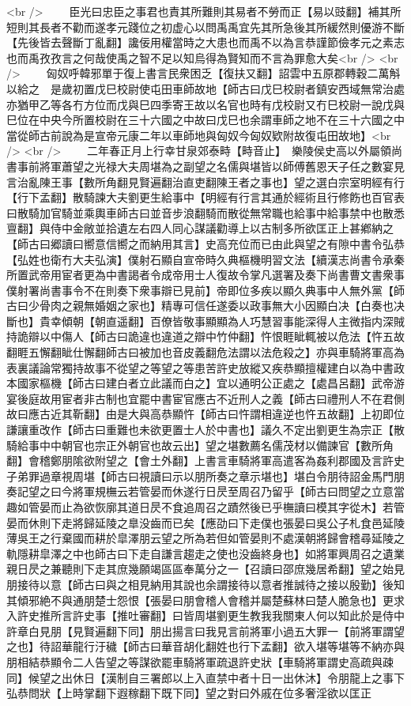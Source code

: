 <br />
　　臣光曰忠臣之事君也責其所難則其易者不勞而正【易以豉翻】補其所短則其長者不勸而遂孝元踐位之初虚心以問禹禹宜先其所急後其所緩然則優游不斷【先後皆去聲斷丁亂翻】讒佞用權當時之大患也而禹不以為言恭謹節儉孝元之素志也而禹孜孜言之何哉使禹之智不足以知烏得為賢知而不言為罪愈大矣<br />
<br />
　　匈奴呼韓邪單于復上書言民衆困乏【復扶又翻】詔雲中五原郡轉穀二萬斛以給之　是歲初置戊巳校尉使屯田車師故地【師古曰戊巳校尉者鎮安西域無常治處亦猶甲乙等各冇方位而戊與巳四季寄王故以名官也時有戊校尉又冇巳校尉一說戊與巳位在中央今所置校尉在三十六國之中故曰戊巳也余謂車師之地不在三十六國之中當從師古前說為是宣帝元康二年以車師地與匈奴今匈奴欵附故復屯田故地】<br />
<br />
　　二年春正月上行幸甘泉郊泰畤【畤音止】　樂陵侯史高以外屬領尚書事前將軍蕭望之光禄大夫周堪為之副望之名儒與堪皆以師傅舊恩天子任之數宴見言治亂陳王事【數所角翻見賢遍翻治直吏翻陳王者之事也】望之選白宗室明經有行【行下孟翻】散騎諫大夫劉更生給事中【明經有行言其通於經術且行修飭也百官表曰散騎加官騎並乘輿車師古曰並音步浪翻騎而散從無常職也給事中給事禁中也散悉亶翻】與侍中金敞並拾遺左右四人同心謀議勸導上以古制多所欲匡正上甚鄕納之【師古曰郷讀曰嚮意信嚮之而納用其言】史高充位而已由此與望之有隙中書令弘恭【弘姓也衛冇大夫弘演】僕射石顯自宣帝時久典樞機明習文法【續漢志尚書令承秦所置武帝用宦者更為中書謁者令成帝用士人復故令掌凡選署及奏下尚書曹文書衆事僕射署尚書事令不在則奏下衆事辯已見前】帝即位多疾以顯久典事中人無外黨【師古曰少骨肉之親無婚姻之家也】精專可信任遂委以政事無大小因顯白决【白奏也决斷也】貴幸傾朝【朝直遥翻】百僚皆敬事顯顯為人巧慧習事能深得人主微指内深賊持詭辯以中傷人【師古曰詭違也違道之辯中竹仲翻】忤恨睚眦輒被以危法【忤五故翻睚五懈翻眦仕懈翻師古曰被加也音皮義翻危法謂以法危殺之】亦與車騎將軍高為表裏議論常獨持故事不從望之等望之等患苦許史放縱又疾恭顯擅權建白以為中書政本國家樞機【師古曰建白者立此議而白之】宜以通明公正處之【處昌呂翻】武帝游宴後庭故用宦者非古制也宜罷中書宦官應古不近刑人之義【師古曰禮刑人不在君側故曰應古近其靳翻】由是大與高恭顯忤【師古曰忤謂相違逆也忤五故翻】上初即位謙讓重改作【師古曰重難也未欲更置士人於中書也】議久不定出劉更生為宗正【散騎給事中中朝官也宗正外朝官也故云出】望之堪數薦名儒茂材以備諫官【數所角翻】會稽鄭朋隂欲附望之【會土外翻】上書言車騎將軍高遣客為姦利郡國及言許史子弟罪過章視周堪【師古曰視讀曰示以朋所奏之章示堪也】堪白令朋待詔金馬門朋奏記望之曰今將軍規橅云若管晏而休遂行日昃至周召乃留乎【師古曰問望之立意當趣如管晏而止為欲恢廓其道日昃不食追周召之蹟然後已乎橅讀曰模其字從木】若管晏而休則下走將歸延陵之臯没齒而已矣【應劭曰下走僕也張晏曰吳公子札食邑延陵薄吳王之行棄國而耕於皐澤朋云望之所為若但如管晏則不處漢朝將歸會稽尋延陵之軌隱耕皐澤之中也師古曰下走自謙言趨走之使也没齒終身也】如將軍興周召之遺業親日昃之兼聽則下走其庶幾願竭區區奉萬分之一【召讀曰邵庶幾居希翻】望之始見朋接待以意【師古曰與之相見納用其說也余謂接待以意者推誠待之接以殷勤】後知其傾邪絶不與通朋楚士怨恨【張晏曰朋會稽人會稽并屬楚蘇林曰楚人脆急也】更求入許史推所言許史事【推吐審翻】曰皆周堪劉更生教我我關東人何以知此於是侍中許章白見朋【見賢遍翻下同】朋出揚言曰我見言前將軍小過五大罪一【前將軍謂望之也】待詔華龍行汙穢【師古曰華音胡化翻姓也行下孟翻】欲入堪等堪等不納亦與朋相結恭顯令二人告望之等謀欲罷車騎將軍疏退許史狀【車騎將軍謂史高疏與疎同】候望之出休日【漢制自三署郎以上入直禁中者十日一出休沐】令朋龍上之事下弘恭問狀【上時掌翻下遐稼翻下既下同】望之對曰外戚在位多奢淫欲以匡正